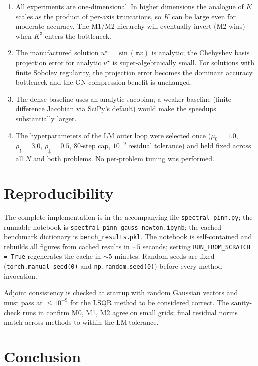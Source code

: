 \documentclass[11pt,a4paper]{article}
\begin{document}
\begin{enumerate}[leftmargin=*]
    \item All experiments are one-dimensional. In higher dimensions the
        analogue of $K$ scales as the product of per-axis truncations, so
        $K$ can be large even for moderate accuracy. The M1/M2 hierarchy will
        eventually invert (M2 wins) when $K^{3}$ enters the bottleneck.
    \item The manufactured solution $u^{\star}=\sin(\pi x)$ is analytic; the
        Chebyshev basis projection error for analytic $u^{\star}$ is super-algebraically
        small. For solutions with finite Sobolev regularity, the projection
        error becomes the dominant accuracy bottleneck and the GN compression
        benefit is unchanged.
    \item The dense baseline uses an analytic Jacobian; a weaker baseline
        (finite-difference Jacobian via SciPy's default) would make the
        speedups substantially larger.
    \item The hyperparameters of the LM outer loop were selected once
        ($\mu_{0}=1.0$, $\rho_{\uparrow}=3.0$, $\rho_{\downarrow}=0.5$,
        80-step cap, $10^{-9}$ residual tolerance) and held fixed across all
        $N$ and both problems. No per-problem tuning was performed.
\end{enumerate}

\section{Reproducibility}
\label{sec:repro}

The complete implementation is in the accompanying file \texttt{spectral\_pinn.py};
the runnable notebook is \texttt{spectral\_pinn\_gauss\_newton.ipynb}; the
cached benchmark dictionary is \texttt{bench\_results.pkl}. The notebook is
self-contained and rebuilds all figures from cached results in $\sim 5$ seconds;
setting \texttt{RUN\_FROM\_SCRATCH = True} regenerates the cache in
$\sim 5$ minutes. Random seeds are fixed (\texttt{torch.manual\_seed(0)} and
\texttt{np.random.seed(0)}) before every method invocation.

Adjoint consistency is checked at startup with random Gaussian vectors and
must pass at $\le 10^{-9}$ for the LSQR method to be considered correct. The
sanity-check runs in  confirm M0, M1, M2 agree on small
grids; final residual norms match across methods to within the LM tolerance.

\section{Conclusion}
\label{sec:conclusion}
\end{document}
